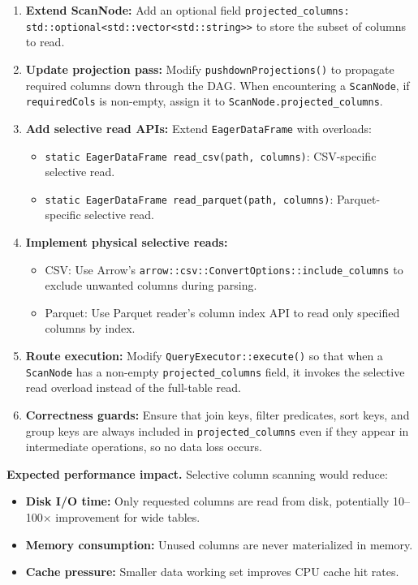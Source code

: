 \documentclass[11pt,a4paper]{article}
\begin{document}
\begin{enumerate}[leftmargin=*]
	\item \textbf{Extend ScanNode:} Add an optional field \texttt{projected\_columns: std::optional<std::vector<std::string>>} to store the subset of columns to read.
	
	\item \textbf{Update projection pass:} Modify \texttt{pushdownProjections()} to propagate required columns down through the DAG. When encountering a \texttt{ScanNode}, if \texttt{requiredCols} is non-empty, assign it to \texttt{ScanNode.projected\_columns}.
	
	\item \textbf{Add selective read APIs:} Extend \texttt{EagerDataFrame} with overloads:
	\begin{itemize}[leftmargin=*]
		\item \texttt{static EagerDataFrame read\_csv(path, columns)}: CSV-specific selective read.
		\item \texttt{static EagerDataFrame read\_parquet(path, columns)}: Parquet-specific selective read.
	\end{itemize}
	
	\item \textbf{Implement physical selective reads:}
	\begin{itemize}[leftmargin=*]
		\item CSV: Use Arrow's \texttt{arrow::csv::ConvertOptions::include\_columns} to exclude unwanted columns during parsing.
		\item Parquet: Use Parquet reader's column index API to read only specified columns by index.
	\end{itemize}
	
	\item \textbf{Route execution:} Modify \texttt{QueryExecutor::execute()} so that when a \texttt{ScanNode} has a non-empty \texttt{projected\_columns} field, it invokes the selective read overload instead of the full-table read.
	
	\item \textbf{Correctness guards:} Ensure that join keys, filter predicates, sort keys, and group keys are always included in \texttt{projected\_columns} even if they appear in intermediate operations, so no data loss occurs.
\end{enumerate}

\textbf{Expected performance impact.}
Selective column scanning would reduce:
\begin{itemize}[leftmargin=*]
	\item \textbf{Disk I/O time:} Only requested columns are read from disk, potentially 10--100\(\times\) improvement for wide tables.
	\item \textbf{Memory consumption:} Unused columns are never materialized in memory.
	\item \textbf{Cache pressure:} Smaller data working set improves CPU cache hit rates.
\end{itemize}
\end{document}
